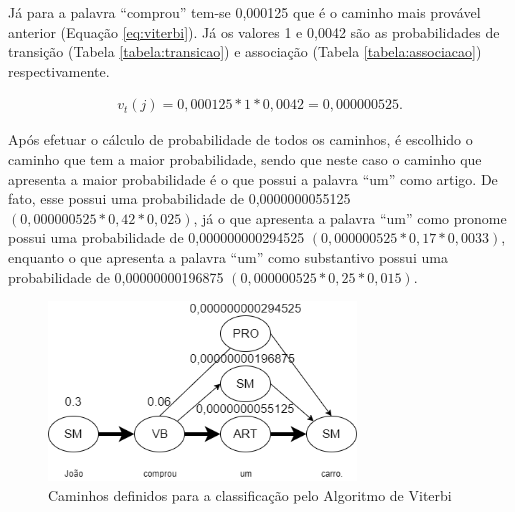 Já para a palavra ``comprou'' tem-se 0,000125  que é o caminho mais provável
anterior (Equação \ref{eq:viterbi}). Já os valores 1 e 0,0042 são as probabilidades de transição (Tabela
\ref{tabela:transicao}) e associação (Tabela \ref{tabela:associacao})
respectivamente.

\begin{equation}
\begin{split}
v_t(j) = 0,000125 * 1 * 0,0042 = 0,000000525.
\end{split}
\label{eq:comprou}
\end{equation}

Após efetuar o cálculo de probabilidade de todos os caminhos, é escolhido o
caminho que tem a maior probabilidade, sendo que neste caso o caminho que
apresenta a maior probabilidade é o que possui a palavra ``um'' como artigo.
De fato, esse possui uma probabilidade de 0,0000000055125 $ (0,000000525 *
0,42 * 0,025)$, já o que apresenta a palavra
``um'' como pronome possui uma probabilidade de 0,000000000294525 $(0,000000525
* 0,17 * 0,0033)$, enquanto o que apresenta a palavra ``um'' como
substantivo possui uma probabilidade de 0,00000000196875 $(0,000000525 * 0,25 *
0,015)$.


\begin{figure}[htbp]
\centering
\includegraphics[height=180px]{imagens/markov2.png}
\caption{Caminhos definidos para a classificação pelo Algoritmo de Viterbi}
\label{fig:markov2}
\end{figure}


%
%
%

